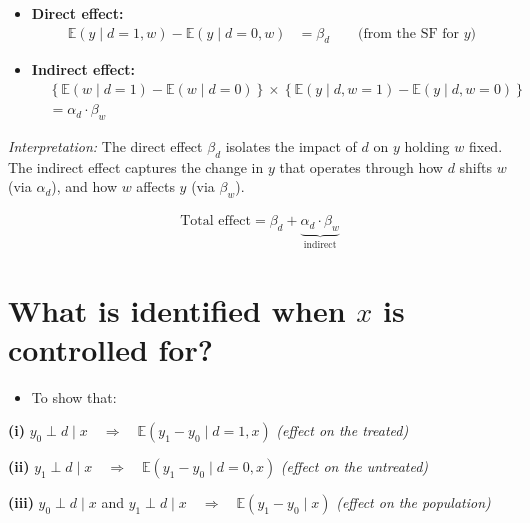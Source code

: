 \documentclass[12pt]{article}
\begin{document}
\begin{itemize}
    \item \textbf{Direct effect:}
    \begin{align}
        \mathbb{E}(y \mid d = 1, w) - \mathbb{E}(y \mid d = 0, w) &= \beta_d \qquad \text{(from the SF for $y$)}
    \end{align}
    
    \item \textbf{Indirect effect:}
    \begin{align}
        &\left\{ \mathbb{E}(w \mid d = 1) - \mathbb{E}(w \mid d = 0) \right\} 
        \times 
        \left\{ \mathbb{E}(y \mid d, w = 1) - \mathbb{E}(y \mid d, w = 0) \right\} \\
        &= \alpha_d \cdot \beta_w
    \end{align}
\end{itemize}

\textit{Interpretation:}  
The direct effect $\beta_d$ isolates the impact of $d$ on $y$ holding $w$ fixed.  
The indirect effect captures the change in $y$ that operates through how $d$ shifts $w$ (via $\alpha_d$), and how $w$ affects $y$ (via $\beta_w$).

\begin{align}
\text{Total effect} = \beta_d + \underbrace{\alpha_d \cdot \beta_w}_{\text{indirect}}
\end{align}

\section*{What is identified when $x$ is controlled for?}

\begin{itemize}
  \item To show that:
\end{itemize}

\textbf{(i)} \quad $y_0 \perp d \mid x \quad \Rightarrow \quad \mathbb{E}(y_1 - y_0 \mid d = 1, x)$ \quad \textit{(effect on the treated)}

\textbf{(ii)} \quad $y_1 \perp d \mid x \quad \Rightarrow \quad \mathbb{E}(y_1 - y_0 \mid d = 0, x)$ \quad \textit{(effect on the untreated)}

\textbf{(iii)} \quad $y_0 \perp d \mid x$ and $y_1 \perp d \mid x \quad \Rightarrow \quad \mathbb{E}(y_1 - y_0 \mid x)$ \quad \textit{(effect on the population)}

\vspace{1em}
\end{document}

